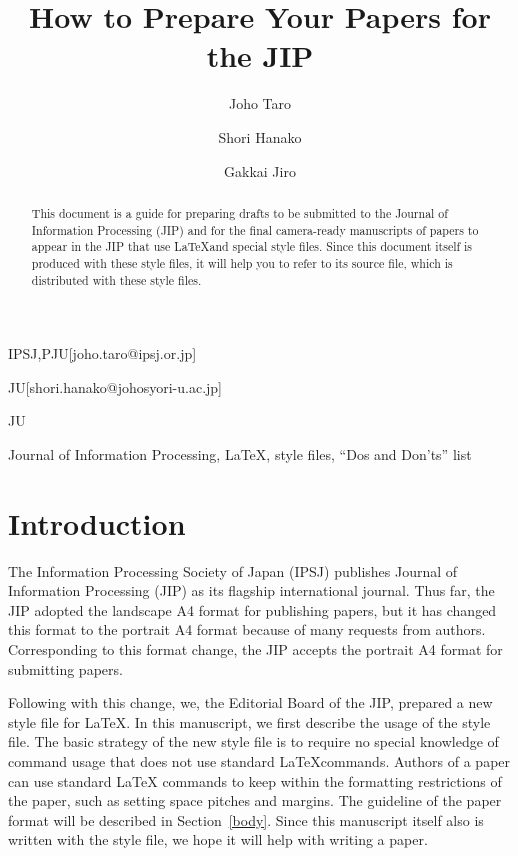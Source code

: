 \documentclass[JIP]{ipsj}
\begin{document}
\title{How to Prepare Your Papers for the JIP}


\author{Joho Taro}{IPSJ,PJU}[joho.taro@ipsj.or.jp]
\author{Shori Hanako}{JU}[shori.hanako@johosyori-u.ac.jp]
\author{Gakkai Jiro}{JU}

\begin{abstract}
This document is a guide for preparing drafts to be submitted to the
Journal of Information Processing (JIP) and for the final camera-ready
manuscripts of papers to appear in the JIP that use \LaTeX and special
style files.  Since this document itself is produced with these style
files, it will help you to refer to its source file, which is
distributed with these style files.
\end{abstract}

\begin{keyword}
Journal of Information Processing, \LaTeX, style files, ``Dos and
 Don'ts'' list
\end{keyword}

\maketitle

\section{Introduction}

The Information Processing Society of Japan (IPSJ) publishes Journal of
Information Processing (JIP) as its flagship international journal.
Thus far, the JIP adopted the landscape A4 format for publishing papers,
but it has changed this format to the portrait A4 format because of many
requests from authors.  Corresponding to this format change, the JIP
accepts the portrait A4 format for submitting papers.

Following with this change, we, the Editorial Board of the JIP, prepared
a new style file for \LaTeX\@.  In this manuscript, we first describe
the usage of the style file.  The basic strategy of the new style file
is to require no special knowledge of command usage that does not use
standard \LaTeX commands.  Authors of a paper can use standard \LaTeX
commands to keep within the formatting restrictions of the paper, such
as setting space pitches and margins.  The guideline of the paper format
will be described in Section~\ref{body}.  Since this manuscript itself
also is written with the style file, we hope it will help with writing a
paper.
\end{document}
